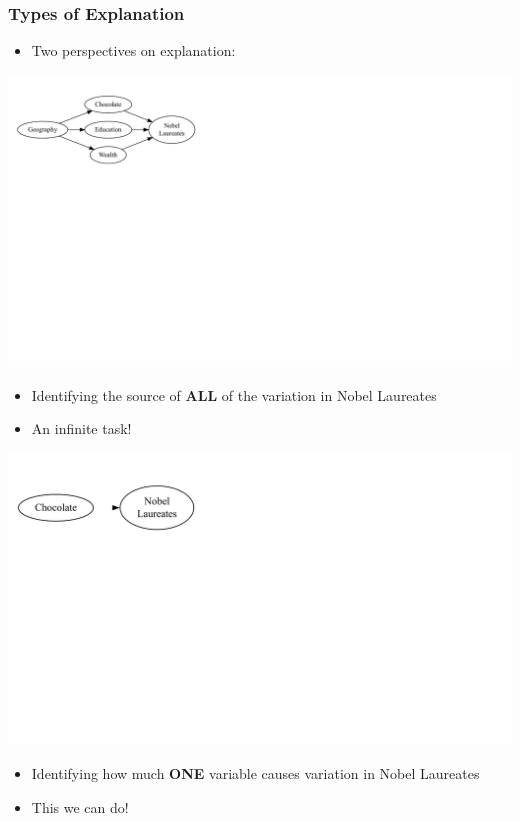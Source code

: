 \documentclass[xcolor=x11names,compress]{beamer}\usepackage[]{graphicx}\usepackage[]{color}
\makeatletter
\def\maxwidth{ %
  \ifdim\Gin@nat@width>\linewidth
    \linewidth
  \else
    \Gin@nat@width
  \fi
}
\newenvironment{knitrout}{}{} %
\renewcommand{\(}{\begin{columns}}
\renewcommand{\)}{\end{columns}}
\newcommand{\<}[1]{\begin{column}{#1}}
\renewcommand{\>}{\end{column}}
\makeatother
\begin{document}
\begin{frame}
\frametitle{Types of Explanation}
\begin{itemize}
\item Two perspectives on explanation:
\end{itemize}
\begin{multicols}{2}
\begin{knitrout}
\color{fgcolor}
\includegraphics[width=\maxwidth]{figure/explanation1c-1} 

\end{knitrout}
\begin{itemize}
\item Identifying the source of \textbf{ALL} of the variation in Nobel Laureates
\item An infinite task!
\end{itemize}
\columnbreak
\begin{knitrout}
\color{fgcolor}
\includegraphics[width=\maxwidth]{figure/explanation2c-1} 

\end{knitrout}
\begin{itemize}
\item Identifying how much \textbf{ONE} variable causes variation in Nobel Laureates
\item This we can do!
\end{itemize}
\end{multicols}
\end{frame}
\end{document}
